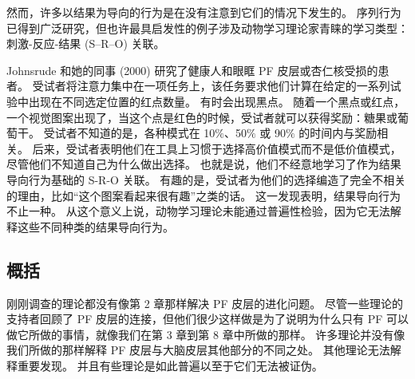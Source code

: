 \par 
然而，许多以结果为导向的行为是在没有注意到它们的情况下发生的。 序列行为已得到广泛研究，但也许最具启发性的例子涉及动物学习理论家青睐的学习类型：刺激-反应-结果 (S–R–O) 关联。
\par 
Johnsrude 和她的同事 (2000) 研究了健康人和眼眶 PF 皮层或杏仁核受损的患者。 受试者将注意力集中在一项任务上，该任务要求他们计算在给定的一系列试验中出现在不同选定位置的红点数量。 有时会出现黑点。 随着一个黑点或红点，一个视觉图案出现了，当这个点是红色的时候，受试者就可以获得奖励：糖果或葡萄干。 受试者不知道的是，各种模式在 10$\%$、50$\%$ 或 90$\%$ 的时间内与奖励相关。 后来，受试者表明他们在工具上习惯于选择高价值模式而不是低价值模式，尽管他们不知道自己为什么做出选择。 也就是说，他们不经意地学习了作为结果导向行为基础的 S-R-O 关联。 有趣的是，受试者为他们的选择编造了完全不相关的理由，比如“这个图案看起来很有趣”之类的话。 这一发现表明，结果导向行为不止一种。 从这个意义上说，动物学习理论未能通过普遍性检验，因为它无法解释这些不同种类的结果导向行为。
\subsection{概括}
刚刚调查的理论都没有像第 2 章那样解决 PF 皮层的进化问题。 尽管一些理论的支持者回顾了 PF 皮层的连接，但他们很少这样做是为了说明为什么只有 PF 可以做它所做的事情，就像我们在第 3 章到第 8 章中所做的那样。 许多理论并没有像我们所做的那样解释 PF 皮层与大脑皮层其他部分的不同之处。 其他理论无法解释重要发现。 并且有些理论是如此普遍以至于它们无法被证伪。